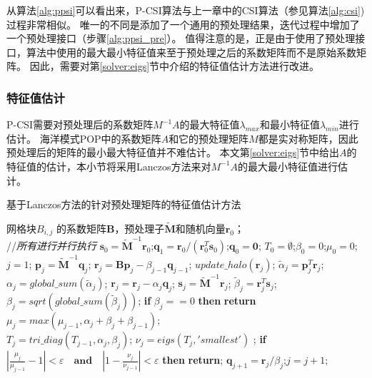 从算法\ref{alg:ppsi}可以看出来，P-CSI算法与上一章中的CSI算法（参见算法\ref{alg:csi})过程非常相似。
唯一的不同是添加了一个通用的预处理结果，迭代过程中增加了一个预处理接口（步骤\ref{alg:ppsi_pre}）。 
值得注意的是，正是由于使用了预处理接口，算法中使用的最大最小特征值来至于预处理之后的系数矩阵而不是原始系数矩阵。 
因此，需要对第\ref{solver:eigs}节中介绍的特征值估计方法进行改进。


\subsubsection{特征值估计}
\label{precond:pcsi:eigs}
P-CSI需要对预处理后的系数矩阵$M^{-1}A$的最大特征值$\lambda_{max}$和最小特征值$\lambda_{min}$进行估计。 
海洋模式POP中的系数矩阵$A$和它的预处理矩阵$M$都是实对称矩阵，因此预处理后的矩阵的最小最大特征值并不难估计。 
本文第\ref{solver:eigs}节中给出$A$的特征值的估计，本小节将采用Lanczos方法\cite{Paige1980235}来对$M^{-1}A$的最大最小特征值进行估计。


\begin{algorithm}[!ht]
\caption{基于Lanczos方法的针对预处理矩阵的特征值估计方法}
\label{alg:lanczos_pre}
\begin{algorithmic}[1]
\REQUIRE 网格块$B_{i,j}$ 的系数矩阵$\textbf{B}$，预处理子$\tilde{\textbf{M}}$和随机向量$\textbf{r}_0$； \\
 //\qquad    \textit{所有进行并行执行}
\STATE $\textbf{s}_0=\tilde{\textbf{M}}^{-1}\textbf{r}_0$;\quad $\textbf{q}_1 = \textbf{r}_0/({\textbf{r}_0^T\textbf{s}_0})$;\quad $\textbf{q}_0=\textbf{0}$;
\STATE $T_0=\emptyset$;\quad $\beta_0 =0$;\quad  $\mu_0 =0$;\quad $j=1$;
\STATE $\textbf{p}_j = \tilde{\textbf{M}}^{-1}\textbf{q}_j$; \quad $\textbf{r}_j=\textbf{B}\textbf{p}_j-\beta_{j-1}\textbf{q}_{j-1}$;
\STATE $update\_halo(\textbf{r}_j)$;
\STATE $\tilde{\alpha}_j =\textbf{p}_j^T\textbf{r}_j$; \quad $\alpha_j=global\_sum(\tilde{\alpha}_j)$;
\STATE $\textbf{r}_j=\textbf{r}_j-\alpha_{j}\textbf{q}_{j}$; \quad $\textbf{s}_j = \tilde{\textbf{M}}^{-1}\textbf{r}_j$;
\STATE $\tilde{\beta}_j = \textbf{r}_j^T\textbf{s}_j$; \quad $\beta_j=sqrt(global\_sum(\tilde{\beta}_j))$;
\STATE \textbf{if} $\beta_j == 0$ \textbf{then} \textbf{return}
\STATE $\mu_j = max(\mu_{j-1},\alpha_j+\beta_j+\beta_{j-1})$; \label{lan_gersh}\\
\STATE $T_j=tri\_diag(T_{j-1},\alpha_j,\beta_j)$; \label{lan_tm}
\STATE $\nu_j = eigs(T_j,'smallest')$ ; \label{lan_nu}
\STATE \textbf{if} $|\frac{\mu_j}{\mu_{j-1}} -1 |< \varepsilon\quad\textbf{and}\quad|1- \frac{\nu_j}{\nu_{j-1}}|< \varepsilon$ \textbf{then} \textbf{return}; \label{lanczos_converge}
\STATE $\textbf{q}_{j+1}= \textbf{r}_j/\beta_j$;\quad $j=j+1$;
\ENDWHILE
\end{algorithmic}
\end{algorithm}

